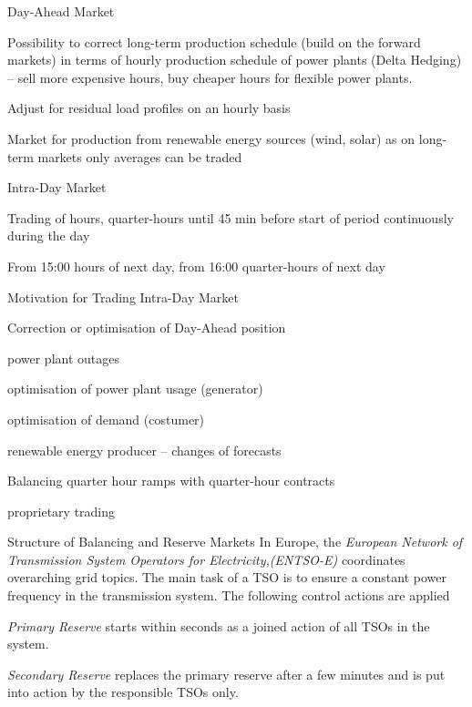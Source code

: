 {Day-Ahead Market }


	Possibility to correct long-term production schedule  (build on the forward markets) in terms of hourly production schedule of power plants (Delta Hedging) -- sell more expensive hours, buy cheaper hours for flexible power plants.

	Adjust for residual load profiles on an hourly basis

	Market for production from renewable energy sources (wind, solar) as on long-term markets only averages can be traded


{Intra-Day Market }


	Trading of hours, quarter-hours until 45 min before start of period continuously during the day

	From 15:00 hours of next day, from 16:00 quarter-hours of next day


{Motivation for Trading Intra-Day Market }


	Correction or optimisation of Day-Ahead position


	power plant outages

	optimisation of power plant usage (generator)

	optimisation of demand (costumer)

	renewable energy producer -- changes of forecasts


	Balancing quarter hour ramps with quarter-hour contracts

	proprietary trading


{Structure of Balancing and Reserve Markets }
In Europe, the {\it European Network of Transmission System Operators for
Electricity,(ENTSO-E)} coordinates overarching grid topics. The main task
of a TSO is to ensure a constant power frequency in the transmission system.
The following control actions are applied


	{\it Primary Reserve}   starts within seconds as a joined action of all TSOs in the system.

	{\it Secondary Reserve} replaces the primary reserve after a few minutes and is put into action by the responsible TSOs only.

